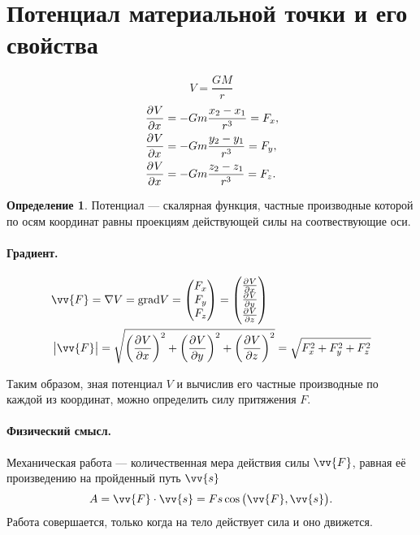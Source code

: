 \documentclass[11pt, a4paper]{article}
\theoremstyle{plain}
\theoremstyle{definition}
\newtheorem{definition}{Определение}
\theoremstyle{remark}
\begin{document}
\section{Потенциал материальной точки и его свойства}
\begin{equation*}
    V = \dfrac{GM}{r}
\end{equation*}
\begin{align*}
    & \dpd{V}{x} = -Gm \dfrac{x_2 - x_1}{r^3} = F_x, \\
    & \dpd{V}{x} = -Gm \dfrac{y_2 - y_1}{r^3} = F_y,\\
    & \dpd{V}{x} = -Gm \dfrac{z_2 - z_1}{r^3} = F_z.
\end{align*}
\begin{definition}
    Потенциал --- скалярная функция, частные производные которой по осям координат равны проекциям
    действующей силы на соотвествующие оси.
\end{definition}
\paragraph{Градиент.} 
\begin{align*}
    &\vv{F} = \nabla V = \textrm{grad} V = \begin{pmatrix}
    F_x \\ F_y \\ F_z \end{pmatrix} = \begin{pmatrix}
        \pd{V}{x}\\\pd{V}{y}\\\pd{V}{z} 
    \end{pmatrix}\\
    &\left| \vv{F} \right| = \sqrt{\left( \dpd{V}{x} \right)^2 +\left( \dpd{V}{y} \right)^2 + \left( \dpd{V}{z} \right)^2} =
    \sqrt{F_x^2 + F_y^2 + F_z^2}
\end{align*}

Таким образом, зная потенциал $V$ и вычислив его частные производные по каждой из координат, можно
определить силу притяжения $F$. 

\paragraph{Физический смысл.}
Механическая работа --- количественная мера действия силы $\vv{F}$, равная её произведению 
на пройденный путь $\vv{s}$
\begin{equation*}
    A = \vv{F}\cdot\vv{s} = Fs\cos{\left( \vv{F}, \vv{s} \right)}.
\end{equation*}
Работа совершается, только когда на тело действует сила и оно движется.
\end{document}
